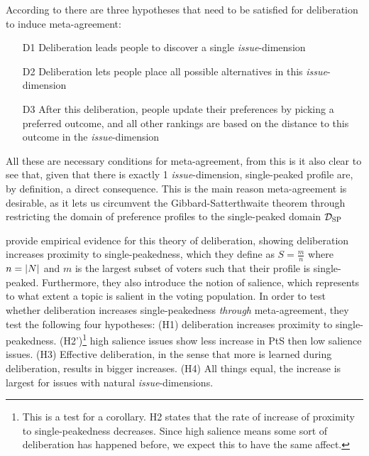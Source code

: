 According to \citet{listTwoConceptsAgreement2002} there are three hypotheses that need to be satisfied for deliberation to induce meta-agreement:
\begin{enumerate}
	\label{list:meta-agreement-checklist}
	\setlength\itemsep{1px}
	\item [D1] Deliberation leads people to discover a single \textit{issue}-dimension
	\item [D2] Deliberation lets people place all possible alternatives in this \textit{issue}-dimension
	\item [D3] After this deliberation, people update their preferences by picking
	      a preferred outcome, and all other rankings are based on the distance to this outcome in the \textit{issue}-dimension
\end{enumerate}

All these are necessary conditions for meta-agreement, from this is it also clear to see that, given that there is exactly 1 \textit{issue}-dimension, single-peaked profile are, by definition, a direct consequence. This is the main reason meta-agreement is desirable, as it lets us circumvent the Gibbard-Satterthwaite theorem \citep{gibbardManipulationVotingSchemes1973, satterthwaiteStrategyproofnessArrowsConditions1975} through restricting the domain of preference profiles to the single-peaked domain $\mathcal{D}_{\textnormal{SP}}$


\citet{listDeliberationSinglePeakednessPossibility2013} provide empirical evidence for this theory of deliberation, showing deliberation increases proximity to single-peakedness, which they define as $S= \frac{m}{n}$ where $n = |N|$ and $m$ is the largest subset of voters such that their profile is single-peaked. Furthermore, they also introduce the notion of salience, which represents to what extent a topic is salient in the voting population. In order to test whether deliberation increases single-peakedness \textit{through} meta-agreement, they test the following four hypotheses: (H1) deliberation increases proximity to single-peakedness. (H2')\footnote{This is a test for a corollary. H2 states that the rate of increase of proximity to single-peakedness decreases. Since high salience means some sort of deliberation has happened before, we expect this to have the same affect.} high salience issues show less increase in PtS then low salience issues. (H3) Effective deliberation, in the sense that more is learned during deliberation, results in bigger increases. (H4) All things equal, the increase is largest for issues with natural \textit{issue}-dimensions.

